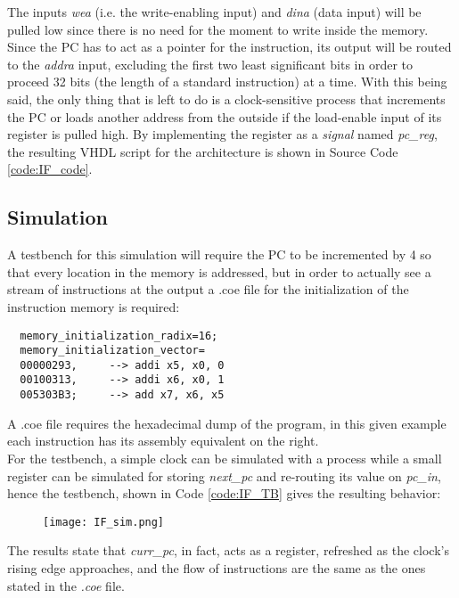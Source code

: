 The inputs \emph{wea} (i.e. the write-enabling input) and \emph{dina} (data input) will be pulled low since there is no need for the moment to write inside the memory. 
Since the PC has to act as a pointer for the instruction, its output will be routed to the \emph{addra} input, excluding the first two least significant bits in order to proceed 32 bits (the length of a standard instruction) at a time.
With this being said, the only thing that is left to do is a clock-sensitive process that increments the PC or loads another address from the outside if the load-enable input of its register is pulled high. 
By implementing the register as a \emph{signal} named \emph{pc{\_}reg}, the resulting VHDL script for the architecture is shown in Source Code \ref{code:IF_code}.


\subsection{Simulation}
A testbench for this simulation will require the PC to be incremented by 4 so that every location in the memory is addressed, but in order to actually see a stream of instructions at the output a .coe file for the initialization of the instruction memory is required:

\begin{verbatim}
  memory_initialization_radix=16;
  memory_initialization_vector=
  00000293,     --> addi x5, x0, 0
  00100313,     --> addi x6, x0, 1
  005303B3;     --> add x7, x6, x5
\end{verbatim}
A .coe file requires the hexadecimal dump of the program, in this given example each instruction has its assembly equivalent on the right.\\
For the testbench, a simple clock can be simulated with a process while a small register can be simulated for storing \emph{next{\_}pc} and re-routing its value on \emph{pc{\_}in}, hence the testbench, shown in Code \ref{code:IF_TB} gives the resulting behavior:

\begin{figure}[h!]
  \centering
  \texttt{[image: IF\_sim.png]}
\end{figure}

The results state that \emph{curr{\_}pc}, in fact, acts as a register, refreshed as the clock's rising edge approaches, and the flow of instructions are the same as the ones stated in the \emph{.coe} file. 
